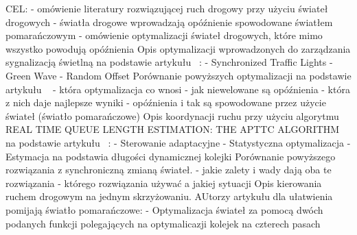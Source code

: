 CEL:
\newline
- omówienie literatury rozwiązującej ruch drogowy przy użyciu świateł drogowych
\newline
- światła drogowe wprowadzają opóźnienie spowodowane światłem pomarańczowym
\newline
- omówienie optymalizacji świateł drogowych, które mimo wszystko powodują opóźnienia
\newline
\newline
Opis optymalizacji wprowadzonych do zarządzania sygnalizacją świetlną na podstawie artykułu ~\cite{brockfeld2001optimizing}:
  \newline
  - Synchronized Traffic Lights
  \newline
  - Green Wave
  \newline
  - Random Offset
\newline
\newline
Porównanie powyższych optymalizacji na podstawie artykułu ~\cite{brockfeld2001optimizing}
\newline
- która optymalizacja co wnosi
\newline
- jak niewelowane są opóźnienia
\newline
- która z nich daje najlepsze wyniki
\newline
- opóźnienia i tak są spowodowane przez użycie świateł (światło pomarańczowe)
\newline
\newline
Opis koordynacji ruchu przy użyciu algorytmu REAL TIME QUEUE LENGTH ESTIMATION: THE APTTC ALGORITHM na podstawie artykułu ~\cite{athmaraman2005adaptive}:
  \newline
  - Sterowanie adaptacyjne
  \newline
  - Statystyczna optymalizacja
  \newline
  - Estymacja na podstawia długości dynamicznej kolejki
  \newline
\newline
Porównanie powyższego rozwiązania z synchroniczną zmianą świateł.
\newline
- jakie zalety i wady dają oba te rozwiązania
\newline
- którego rozwiązania używać a jakiej sytuacji
\newline
\newline
Opis kierowania ruchem drogowym na jednym skrzyżowaniu. AUtorzy artykułu \cite{de1998optimal} dla ułatwienia pomijają światło pomarańczowe:
  \newline
  - Optymalizacja świateł za pomocą dwóch podanych funkcji polegających na optymalicazji kolejek na czterech pasach
